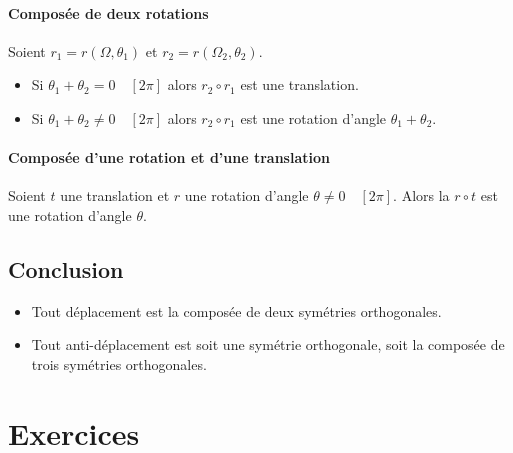             \paragraph{Compos\'ee de deux rotations}
                  Soient $r_1 = r(\Omega , \theta_1)$ et $r_2 = r(\Omega_2 , \theta_2)$.
                  \begin{itemize}
                        \item Si $\theta_1 + \theta_2 = 0 \quad [2\pi]$ alors $r_2 \circ r_1$ est une translation.
                        \item Si $\theta_1+\theta_2\neq 0\quad [2\pi]$ alors $r_2\circ r_1$ est 
                              une rotation d'angle $\theta_1+\theta_2$.
                  \end{itemize}
            \paragraph{Compos\'ee d'une rotation et d'une translation}
                  Soient $t$ une translation et $r$ une rotation d'angle $\theta \neq 0 \quad [2\pi]$.
                  Alors la $r \circ t$ est une rotation d'angle $\theta$.
      \subsection{Conclusion}
            \begin{itemize}
                  \item Tout d\'eplacement est la compos\'ee de deux sym\'etries orthogonales.
                  \item Tout anti-d\'eplacement est soit une sym\'etrie orthogonale, 
                        soit la compos\'ee de trois sym\'etries orthogonales.
            \end{itemize}
















\TCDLessonStyleOff
\clearpage
\providecommand{\Droite}{(\mathscr{D})}
\providecommand{\AngleEgal}[3]{#1 = #2 \quad \left[ #3 \right] }
\providecommand{\mes}[2]{\mathrm{mes}\left( \widehat{ \overrightarrow{#1} , \overrightarrow{#2} } \right)}
\section{Exercices}
























